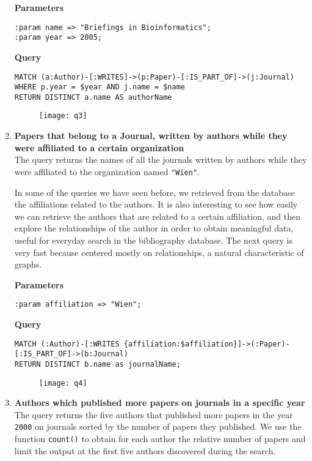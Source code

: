 \begin{enumerate}
    \textbf{Parameters}
    \begin{lstlisting}[label={lst:lstlisting24}]
:param name => "Briefings in Bioinformatics";
:param year => 2005;
    \end{lstlisting}
    \textbf{Query}
    \begin{lstlisting}[label={lst:lstlisting25}]
MATCH (a:Author)-[:WRITES]->(p:Paper)-[:IS_PART_OF]->(j:Journal)
WHERE p.year = $year AND j.name = $name
RETURN DISTINCT a.name AS authorName
    \end{lstlisting}
    \begin{figure}[H]
        \begin{center}
            \texttt{[image: q3]}
            \label{fig:q3}%
        \end{center}
    \end{figure}
    \item \textbf{Papers that belong to a Journal, written by authors while they were affiliated to a certain organization}\\
    The query returns the names of all the journals written by authors while they were affiliated to the organization named \verb|"Wien"|.

    In some of the queries we have seen before, we retrieved from the database the affiliations related to the authors.
    It is also interesting to see how easily we can retrieve the authors that are related to a certain affiliation, and then explore the relationships of the author in order to obtain meaningful data, useful for everyday search in the bibliography database.
    The next query is very fast because centered mostly on relationships, a natural characteristic of graphs.

    \textbf{Parameters}
    \begin{lstlisting}[label={lst:lstlisting26}]
:param affiliation => "Wien";
    \end{lstlisting}
    \textbf{Query}
    \begin{lstlisting}[label={lst:lstlisting27}]
MATCH (:Author)-[:WRITES {affiliation:$affiliation}]->(:Paper)-[:IS_PART_OF]->(b:Journal)
RETURN DISTINCT b.name as journalName;
    \end{lstlisting}
    \begin{figure}[H]
        \begin{center}
            \texttt{[image: q4]}
            \label{fig:q4}%
        \end{center}
    \end{figure}
    \item \textbf{Authors which published more papers on journals in a specific year}\\
    The query returns the five authors that published more papers in the year \verb|2000| on journals sorted by the number of papers they published.
    We use the function \verb|count()| to obtain for each author the relative number of papers and limit the output at the first five authors discovered during the search.


\end{enumerate}
